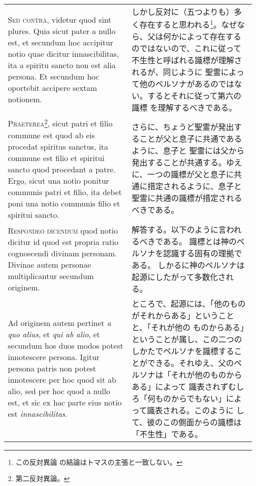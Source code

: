 \documentclass[10pt]{jsarticle} %
\begin{document}
\begin{longtable}{p{21em}p{21em}}
\\



{\scshape Sed contra}, videtur quod sint plures. Quia sicut pater a nullo est, et
secundum hoc accipitur notio quae dicitur innascibilitas, ita a
spiritu sancto non est alia persona. Et secundum hoc oportebit
accipere sextam notionem.

&

しかし反対に（五つよりも）多く存在すると思われる\footnote{この反対異論
の結論はトマスの主張と一致しない。}。なぜなら、父は何かによって存在する
のではないので、これに従って不生性と呼ばれる識標が理解されるが、同じように
聖霊によって他のペルソナがあるのではない。するとそれに従って第六の識標
を理解するべきである。


\\



{\scshape Praeterea}\footnote{第二反対異論。}, sicut patri et filio commune est quod ab eis procedat
spiritus sanctus, ita commune est filio et spiritui sancto quod
procedant a patre. Ergo, sicut una notio ponitur communis patri et
filio, ita debet poni una notio communis filio et spiritui sancto.

&

さらに、ちょうど聖霊が発出することが父と息子に共通であるように、息子と
聖霊には父から発出することが共通する。ゆえに、一つの識標が父と息子に共
通に措定されるように、息子と聖霊に共通の識標が措定されるべきである。


\\



{\scshape Respondeo dicendum} quod notio dicitur id quod est propria ratio
cognoscendi divinam personam. Divinae autem personae multiplicantur
secundum originem. 


&

解答する。以下のように言われるべきである。
識標とは神のペルソナを認識する固有の理拠である。
しかるに神のペルソナは起源にしたがって多数化される。

\\


Ad originem autem pertinet {\itshape a quo alius}, et {\itshape qui ab
alio}, et secundum hos duos modos potest innotescere persona. Igitur
persona patris non potest innotescere per hoc quod sit ab alio, sed
per hoc quod a nullo est, et sic ex hac parte eius notio est
{\itshape innascibilitas}. 


&

ところで、起源には、「他のものがそれからある」ということと、「それが他の
ものからある」ということが属し、この二つのしかたでペルソナを識標するこ
とができる。それゆえ、父のペルソナは「それが他のものからある」によって
 識表されずむしろ「何ものからでもない」によって識表される。このように
 して、彼のこの側面からの識標は「不生性」である。


\end{longtable}
\end{document}
